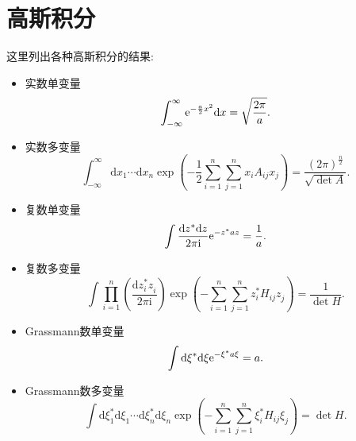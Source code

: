 \section{高斯积分}
这里列出各种高斯积分的结果:
\begin{itemize}
\item 实数单变量
\begin{equation}
\int_{-\infty}^{\infty} \mathrm{e}^{-\frac{a}{2} x^{2}} \mathrm{d} x=\sqrt{\frac{2 \pi}{a}}.
\end{equation}

\item 实数多变量
\begin{equation}
\int_{-\infty}^{\infty} \mathrm{d} x_{1} \cdots \mathrm{d} x_{n} \exp\left({-\frac{1}{2} \sum\limits_{i=1}^n\sum\limits_{j=1}^n x_{i} A_{i j} x_{j}}\right)=\frac{(2\pi)^\frac{n}{2}}{\sqrt{\det A}}.
\end{equation}
\item 复数单变量
\begin{equation}
\int \frac{\mathrm{d} z^{*} \mathrm{d} z}{2 \pi \mathrm{i}} \mathrm{e}^{-z^{*} a z}=\frac{1}{a}.
\end{equation}
\item 复数多变量
\begin{equation}
\int \prod_{i=1}^{n}\left(\frac{\mathrm{d} z_{i}^{*} z^{}_{i}}{2 \pi \mathrm{i}}\right) \exp \left(-\sum\limits_{i=1}^n\sum\limits_{j=1}^n z_{i}^{*} H^{}_{i j} z^{}_{j}\right)=\frac{1}{\det{H}}.
\end{equation}
\item Grassmann数单变量
\begin{equation}
\int \mathrm{d} \xi^{*} \mathrm{d} \xi \mathrm{e}^{-\xi^{*} a \xi}=a.
\end{equation}
\item Grassmann数多变量
\begin{equation}
\int \mathrm{d} \xi_{1}^{*} \mathrm{d} \xi^{}_{1} \cdots \mathrm{d} \xi_{n}^{*} \mathrm{d}\xi^{}_{n} \exp \left(-\sum\limits_{i=1}^n\sum\limits_{j=1}^n \xi_{i}^{*} H^{}_{i j} \xi^{}_{j}\right)=\det H.
\end{equation}
\end{itemize}
